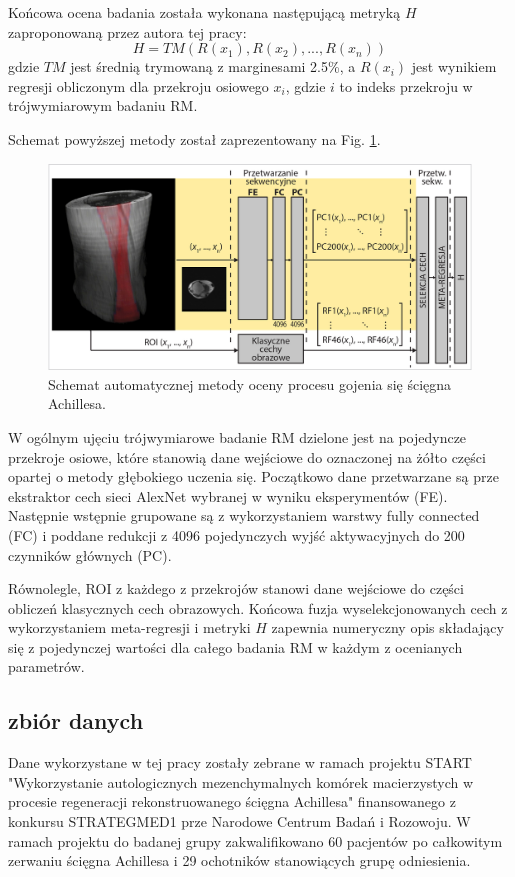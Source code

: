 Końcowa ocena badania została wykonana następującą metryką $H$ zaproponowaną przez autora tej pracy:
\begin{equation}
H = TM(R(x_1), R(x_2),..., R(x_n))
\end{equation}
gdzie $TM$ jest średnią trymowaną z marginesami 2.5\%, a $R(x_i)$ jest wynikiem regresji obliczonym dla przekroju osiowego $x_i$, gdzie $i$ to indeks przekroju w trójwymiarowym badaniu RM.

Schemat powyższej metody został zaprezentowany na Fig. \ref{fig:net}. 
\begin{figure}[h!]
	\includegraphics[width=\textwidth]{figures/net.jpg}
	\caption{Schemat automatycznej metody oceny procesu gojenia się ścięgna Achillesa.} \label{fig:net}
\end{figure}
W ogólnym ujęciu trójwymiarowe badanie RM dzielone jest na pojedyncze przekroje osiowe, które stanowią dane wejściowe do oznaczonej na żółto części opartej o metody głębokiego uczenia się. Początkowo dane przetwarzane są prze ekstraktor cech sieci AlexNet wybranej w wyniku eksperymentów (FE). Następnie wstępnie grupowane są z wykorzystaniem warstwy fully connected (FC) i poddane redukcji z 4096 pojedynczych wyjść aktywacyjnych do 200 czynników głównych (PC).

Równolegle, ROI z każdego z przekrojów stanowi dane wejściowe do części obliczeń klasycznych cech obrazowych. Końcowa fuzja wyselekcjonowanych cech z wykorzystaniem meta-regresji i metryki $H$ zapewnia numeryczny opis składający się z pojedynczej wartości dla całego badania RM w każdym z ocenianych parametrów.

\subsection{zbiór danych}

Dane wykorzystane w tej pracy zostały zebrane w ramach projektu START "Wykorzystanie autologicznych mezenchymalnych komórek macierzystych w procesie regeneracji rekonstruowanego ścięgna Achillesa" finansowanego z konkursu STRATEGMED1 prze Narodowe Centrum Badań i Rozowoju. W ramach projektu do badanej grupy zakwalifikowano 60 pacjentów po całkowitym zerwaniu ścięgna Achillesa i 29 ochotników stanowiących grupę odniesienia. 

